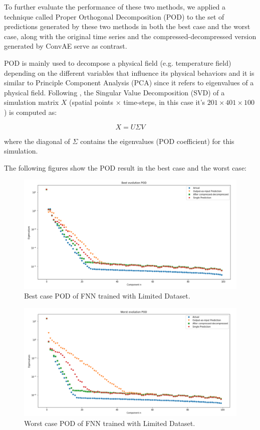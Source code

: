 To further evaluate the performance of these two methods, we applied a technique called Proper Orthogonal Decomposition (POD) to the set of predictions generated by these two methods in both the best case and the worst case, along with the original time series and the compressed-decompressed version generated by ConvAE serve as contrast.

POD is mainly used to decompose a physical field (e.g. temperature field) depending on the different variables that influence its physical behaviors and it is similar to Principle Component Analysis (PCA) since it refers to eigenvalues of a physical field.\citep{10.1146_annurev.fl.25.010193.002543} Following \citep{10.1515_9783110671490-007}, the Singular Value Decomposition (SVD) of a simulation matrix $X$ (spatial points × time-steps, in this case it's $201 \times 401 \times 100$) is computed as:

\begin{equation}
X = U\Sigma V
\end{equation}

where the diagonal of $\Sigma$ contains the eigenvalues (POD coefficient) for this simulation.

The following figures show the POD result in the best case and the worst case:

\begin{figure}[H]
    \caption{Best case POD of FNN trained with Limited Dataset.}
    \includegraphics[scale=0.5]{figures/mantle_convection_images/limited_dataset/FNN_Best_POD.png}
\end{figure}

\begin{figure}[H]
    \caption{Worst case POD of FNN trained with Limited Dataset.}
    \includegraphics[scale=0.5]{figures/mantle_convection_images/limited_dataset/FNN_Worst_POD.png}
\end{figure}

